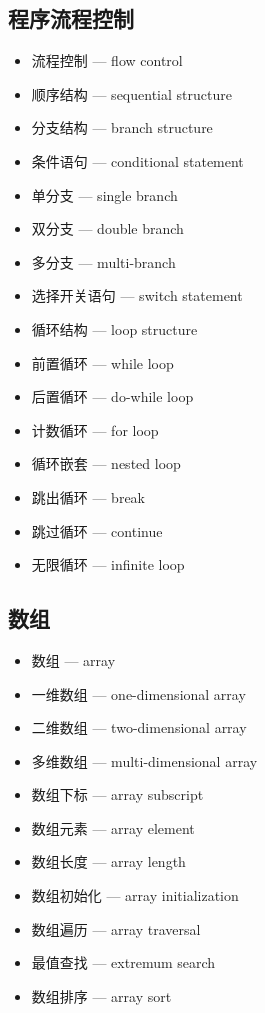 \subsection{程序流程控制}
\begin{itemize}
\item 流程控制 — flow control
\item 顺序结构 — sequential structure
\item 分支结构 — branch structure
\item 条件语句 — conditional statement
\item 单分支 — single branch
\item 双分支 — double branch
\item 多分支 — multi-branch
\item 选择开关语句 — switch statement
\item 循环结构 — loop structure
\item 前置循环 — while loop
\item 后置循环 — do-while loop
\item 计数循环 — for loop
\item 循环嵌套 — nested loop
\item 跳出循环 — break
\item 跳过循环 — continue
\item 无限循环 — infinite loop
\end{itemize}

\subsection{数组}
\begin{itemize}
\item 数组 — array
\item 一维数组 — one-dimensional array
\item 二维数组 — two-dimensional array
\item 多维数组 — multi-dimensional array
\item 数组下标 — array subscript
\item 数组元素 — array element
\item 数组长度 — array length
\item 数组初始化 — array initialization
\item 数组遍历 — array traversal
\item 最值查找 — extremum search
\item 数组排序 — array sort
\end{itemize}

